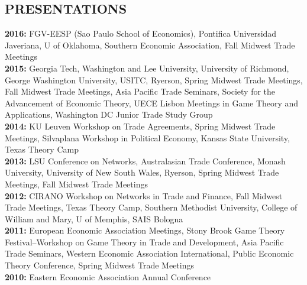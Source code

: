 \documentclass[11pt]{res}
\begin{document}
\begin{resume}
\section{PRESENTATIONS}\vspace{1.5mm}
{\bf 2016:} FGV-EESP (Sao Paulo School of Economics), Pontifica Universidad Javeriana, U of Oklahoma, Southern Economic Association, Fall Midwest Trade Meetings\vspace{1.5mm}\\
{\bf 2015:} Georgia Tech, Washington and Lee University, University of Richmond, George Washington University, USITC, Ryerson, Spring Midwest Trade Meetings, Fall Midwest Trade Meetings, Asia Pacific Trade Seminars, Society for the Advancement of Economic Theory, UECE Lisbon Meetings in Game Theory and Applications, Washington DC Junior Trade Study Group\vspace{1.5mm}\\
{\bf 2014:} KU Leuven Workshop on Trade Agreements, Spring Midwest Trade Meetings, Silvaplana Workshop in Political Economy, Kansas State University, Texas Theory Camp\vspace{1.5mm}\\



\phantom{.}\vspace{.05cm}
{\bf 2013:} LSU Conference on Networks, Australasian Trade Conference, Monash University, University of New South Wales, Ryerson, Spring Midwest Trade Meetings, Fall Midwest Trade Meetings \vspace{1.5mm}\\
{\bf 2012:}  CIRANO Workshop on Networks in Trade and Finance, Fall Midwest Trade Meetings, Texas Theory Camp, Southern Methodist University, College of William and Mary, U of Memphis, SAIS Bologna\vspace{1.5mm}\\
{\bf 2011:} European Economic Association Meetings, Stony Brook Game Theory Festival--Workshop on Game Theory in Trade and Development, Asia Pacific Trade Seminars, Western Economic Association International, Public Economic Theory Conference, Spring Midwest Trade Meetings\vspace{1.5mm}\\
{\bf 2010:} Eastern Economic Association Annual Conference \vspace{1.5mm}\\


\end{resume}
\end{document}
